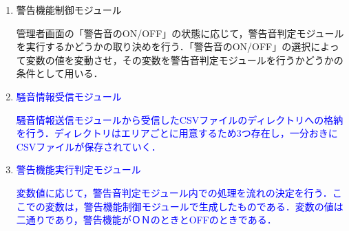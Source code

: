 \begin{enumerate}
\item 警告機能制御モジュール

管理者画面の「警告音のON/OFF」の状態に応じて，警告音判定モジュールを実行するかどうかの取り決めを行う．「警告音のON/OFF」の選択によって変数の値を変動させ，その変数を警告音判定モジュールを行うかどうかの条件として用いる．

\item \textcolor{blue}{騒音情報受信モジュール}

\textcolor{blue}{騒音情報送信モジュールから受信したCSVファイルのディレクトリへの格納を行う．ディレクトリはエリアごとに用意するため3つ存在し，一分おきにCSVファイルが保存されていく．}

\item \textcolor{blue}{警告機能実行判定モジュール}

\textcolor{blue}{変数値に応じて，警告音判定モジュール内での処理を流れの決定を行う．ここでの変数は，警告機能制御モジュールで生成したものである．変数の値は二通りであり，警告機能がＯＮのときとOFFのときである．}
\end{enumerate}





